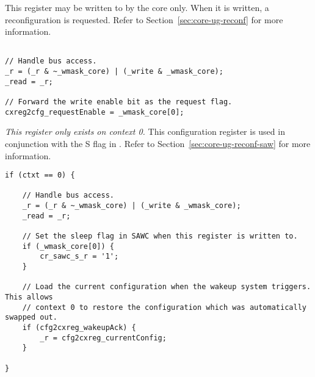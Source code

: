 

This register may be written to by the core only. When it is written, a
reconfiguration is requested. Refer to Section~\ref{sec:core-ug-reconf} for more
information.

\declaration{}
\implementation{}
\begin{lstlisting}

// Handle bus access.
_r = (_r & ~_wmask_core) | (_write & _wmask_core);
_read = _r;

// Forward the write enable bit as the request flag.
cxreg2cfg_requestEnable = _wmask_core[0];

\end{lstlisting}



\emph{This register only exists on context 0.} This configuration register is 
used in conjunction with the S flag in . Refer to
Section~\ref{sec:core-ug-reconf-saw} for more information.

\declaration{}
\implementation{}
\begin{lstlisting}
if (ctxt == 0) {
    
    // Handle bus access.
    _r = (_r & ~_wmask_core) | (_write & _wmask_core);
    _read = _r;
    
    // Set the sleep flag in SAWC when this register is written to.
    if (_wmask_core[0]) {
        cr_sawc_s_r = '1';
    }
    
    // Load the current configuration when the wakeup system triggers. This allows
    // context 0 to restore the configuration which was automatically swapped out.
    if (cfg2cxreg_wakeupAck) {
        _r = cfg2cxreg_currentConfig;
    }
    
}
\end{lstlisting}

